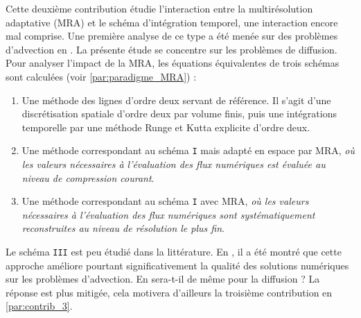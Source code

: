 Cette deuxième contribution étudie l'interaction entre la multirésolution adaptative (MRA) et le schéma d'intégration temporel, 
une interaction encore mal comprise. 
Une première analyse de ce type a été menée sur des problèmes d'advection en \cite{belloti_et_al_2025}. 
La présente étude se concentre sur les problèmes de diffusion. 
Pour analyser l'impact de la MRA, les équations équivalentes de trois schémas sont calculées (voir \ref{par:paradigme_MRA}) :

\begin{enumerate}
    \renewcommand{\labelenumi}{\Roman{enumi}.}
    \item Une méthode des lignes d'ordre deux servant de référence. Il s'agit d'une discrétisation spatiale d'ordre deux par volume finis, 
    puis une intégrations temporelle par une méthode Runge et Kutta explicite d'ordre deux.
    \item Une méthode correspondant au schéma \texttt{I} mais adapté en espace par MRA, \emph{où les valeurs nécessaires à l'évaluation des flux numériques 
    est évaluée au niveau de compression courant}.
    \item Une méthode correspondant au schéma \texttt{I} avec MRA, \emph{où les valeurs nécessaires à l'évaluation des flux numériques 
    sont systématiquement reconstruites au niveau de résolution le plus fin}.
\end{enumerate}
Le schéma \texttt{III} est peu étudié dans la littérature.
En \cite{belloti_et_al_2025}, il a été montré que cette approche améliore pourtant significativement la qualité des solutions numériques sur les problèmes d'advection.
En sera-t-il de même pour la diffusion ? La réponse est plus mitigée, cela motivera d'ailleurs la troisième contribution en \ref{par:contrib_3}.